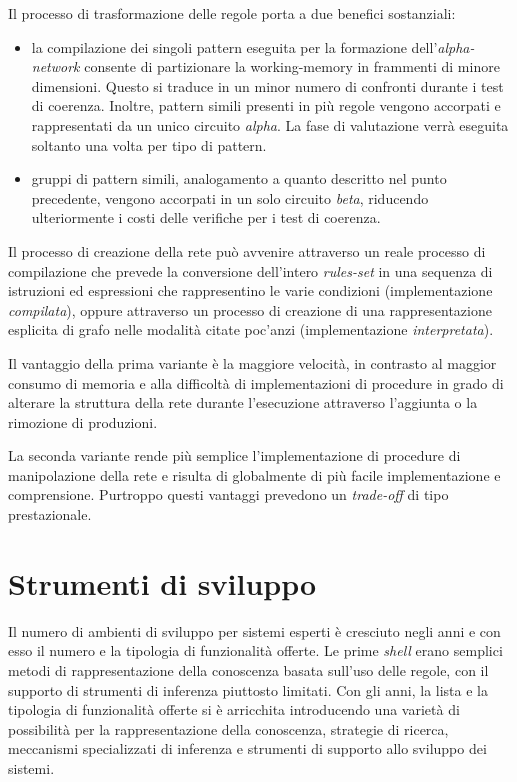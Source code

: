 Il processo di trasformazione delle regole porta a due benefici sostanziali:
\begin{itemize}
	\item la compilazione dei singoli pattern eseguita per la formazione dell'\emph{alpha-network} consente di partizionare la working-memory in frammenti di minore dimensioni. Questo si traduce in un minor numero di confronti durante i test di coerenza. Inoltre, pattern simili presenti in più regole vengono accorpati e rappresentati da un unico circuito \emph{alpha}. La fase di valutazione verrà eseguita soltanto una volta per tipo di pattern.
	\item gruppi di pattern simili, analogamento a quanto descritto nel punto precedente, vengono accorpati in un solo circuito \emph{beta}, riducendo ulteriormente i costi delle verifiche per i test di coerenza.
\end{itemize}

Il processo di creazione della rete può avvenire attraverso un reale processo di compilazione \cite{forgy1982} che prevede la conversione dell'intero \emph{rules-set} in una sequenza di istruzioni ed espressioni che rappresentino le varie condizioni (implementazione \emph{compilata}), oppure attraverso un processo di creazione di una rappresentazione esplicita di grafo nelle modalità citate poc'anzi (implementazione \emph{interpretata}). 

Il vantaggio della prima variante è la maggiore velocità, in contrasto al maggior consumo di memoria e alla difficoltà di implementazioni di procedure in grado di alterare la struttura della rete durante l'esecuzione attraverso l'aggiunta o la rimozione di produzioni.~\cite{Doorenbos95productionmatching}

La seconda variante rende più semplice l'implementazione di procedure di manipolazione della rete e risulta di globalmente di più facile implementazione e comprensione. Purtroppo questi vantaggi prevedono un \emph{trade-off} di tipo prestazionale.~\cite{Doorenbos95productionmatching}


\section{Strumenti di sviluppo}

Il numero di ambienti di sviluppo per sistemi esperti è cresciuto negli anni e con esso il numero e la tipologia di funzionalità offerte. Le prime \emph{shell} erano semplici metodi di rappresentazione della conoscenza basata sull'uso delle regole, con il supporto di strumenti di inferenza piuttosto limitati. Con gli anni, la lista e la tipologia di funzionalità offerte si è arricchita introducendo una varietà di possibilità per la rappresentazione della conoscenza, strategie di ricerca, meccanismi specializzati di inferenza e strumenti di supporto allo sviluppo dei sistemi.

